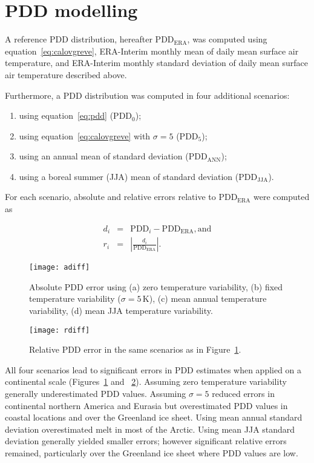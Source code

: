 \documentclass[review]{igs}
\begin{document}

\section{PDD modelling}

A reference PDD distribution, hereafter $\mathrm{PDD_{ERA}}$, was computed using equation~\ref{eq:calovgreve}, ERA-Interim monthly mean of daily mean surface air temperature, and ERA-Interim monthly standard deviation of daily mean surface air temperature described above.

Furthermore, a PDD distribution was computed in four additional scenarios:

\begin{enumerate}
  \item using equation~\ref{eq:pdd} ($\mathrm{PDD_{0}}$);
  \item using equation~\ref{eq:calovgreve} with $\sigma=5$ ($\mathrm{PDD_{5}}$);
  \item using an annual mean of standard deviation ($\mathrm{PDD_{ANN}}$);
  \item using a boreal summer (JJA) mean of standard deviation ($\mathrm{PDD_{JJA}}$).
\end{enumerate}

For each scenario, absolute and relative errors relative to $\mathrm{PDD_{ERA}}$ were computed as

\begin{eqnarray}
  d_i &=& \mathrm{PDD}_i - \mathrm{PDD_{ERA}}, \mathrm{and}\\
  r_i &=& \left|\frac{d_i}{\mathrm{PDD_{ERA}}}\right|.
\end{eqnarray}

\begin{figure}
  \centering\texttt{[image: adiff]}
  \caption{Absolute PDD error using (a) zero temperature variability, (b) fixed temperature variability ($\sigma=5\,\mathrm{K}$), (c) mean annual temperature variability, (d) mean JJA temperature variability.}
  \label{fig:adiff}
\end{figure}

\begin{figure}
  \centering\texttt{[image: rdiff]}
  \caption{Relative PDD error in the same scenarios as in Figure~\ref{fig:adiff}.}
  \label{fig:rdiff}
\end{figure}

All four scenarios lead to significant errors in PDD estimates when applied on a continental scale (Figures~\ref{fig:adiff} and ~\ref{fig:rdiff}). Assuming zero temperature variability generally underestimated PDD values. Assuming $\sigma=5$ reduced errors in continental northern America and Eurasia but overestimated PDD values in coastal locations and over the Greenland ice sheet. Using mean annual standard deviation overestimated melt in most of the Arctic. Using mean JJA standard deviation generally yielded smaller errors; however significant relative errors remained, particularly over the Greenland ice sheet where PDD values are low.
\end{document}
